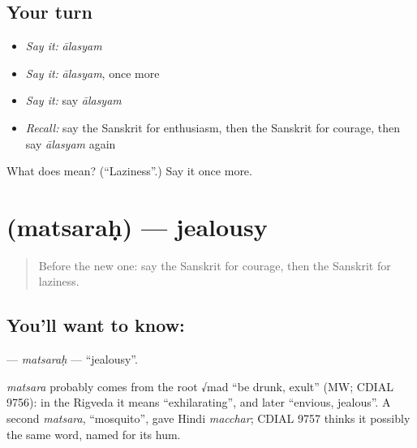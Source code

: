 \subsection*{Your turn}
\begin{itemize}
\raggedright
  \item \emph{Say it:} \emph{ālasyam}
  \item \emph{Say it:} \emph{ālasyam}, once more
  \item \emph{Say it:} say \emph{ālasyam}
  \item \emph{Recall:} say the Sanskrit for enthusiasm, then the Sanskrit for courage, then say \emph{ālasyam} again
\end{itemize}

\begin{tcolorbox}[breakable,colback=teal!4,colframe=teal!35!black,title={Before you move on}]
What does  mean? (\textquotedblleft{}Laziness\textquotedblright{}.) Say it once more.
\end{tcolorbox}
\section[\texorpdfstring{\sk{मत्सरः} (matsaraḥ)}{मत्सरः (matsaraḥ)}]{ (matsaraḥ) — jealousy}

\label{lesson:SA-C151-matsarah}



\begin{quote}
Before the new one: say the Sanskrit for courage, then the Sanskrit for laziness.
\end{quote}

\subsection*{You'll want to know: }
\textbf{} — \emph{matsaraḥ} — \textquotedblleft{}jealousy\textquotedblright{}.

\begin{cousinweb}
\emph{matsara} probably comes from the root √mad \textquotedblleft{}be drunk, exult\textquotedblright{} (MW; CDIAL 9756): in the Rigveda it means \textquotedblleft{}exhilarating\textquotedblright{}, and later \textquotedblleft{}envious, jealous\textquotedblright{}. A second \emph{matsara}, \textquotedblleft{}mosquito\textquotedblright{}, gave Hindi \emph{macchar}; CDIAL 9757 thinks it possibly the same word, named for its hum.
\end{cousinweb}

